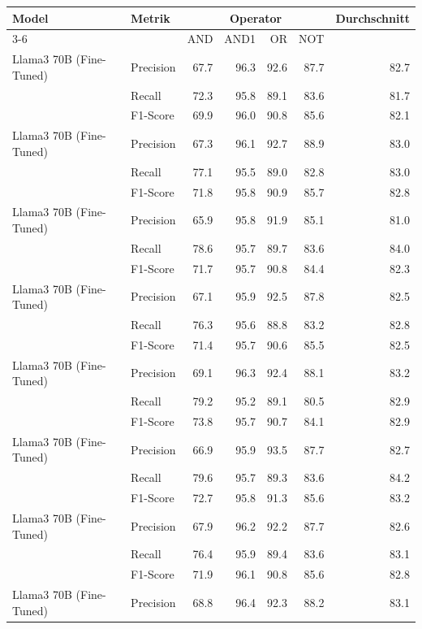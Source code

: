 \begin{table}[!ht]
\centering
\small
\begin{tabular}{llrrrrr}
\toprule
\textbf{Model} & \textbf{Metrik} & \multicolumn{4}{c}{\textbf{Operator}} & \textbf{Durchschnitt} \\
\cmidrule(lr){3-6}
& & AND & AND1 & OR & NOT & \\
\midrule
Llama3 70B
(Fine-Tuned) & Precision & 67.7 & 96.3 & 92.6 & 87.7 & 82.7 \\
 & Recall & 72.3 & 95.8 & 89.1 & 83.6 & 81.7 \\
 & F1-Score & 69.9 & 96.0 & 90.8 & 85.6 & 82.1 \\
\midrule
Llama3 70B
(Fine-Tuned) & Precision & 67.3 & 96.1 & 92.7 & 88.9 & 83.0 \\
 & Recall & 77.1 & 95.5 & 89.0 & 82.8 & 83.0 \\
 & F1-Score & 71.8 & 95.8 & 90.9 & 85.7 & 82.8 \\
\midrule
Llama3 70B
(Fine-Tuned) & Precision & 65.9 & 95.8 & 91.9 & 85.1 & 81.0 \\
 & Recall & 78.6 & 95.7 & 89.7 & 83.6 & 84.0 \\
 & F1-Score & 71.7 & 95.7 & 90.8 & 84.4 & 82.3 \\
\midrule
Llama3 70B
(Fine-Tuned) & Precision & 67.1 & 95.9 & 92.5 & 87.8 & 82.5 \\
 & Recall & 76.3 & 95.6 & 88.8 & 83.2 & 82.8 \\
 & F1-Score & 71.4 & 95.7 & 90.6 & 85.5 & 82.5 \\
\midrule
Llama3 70B
(Fine-Tuned) & Precision & 69.1 & 96.3 & 92.4 & 88.1 & 83.2 \\
 & Recall & 79.2 & 95.2 & 89.1 & 80.5 & 82.9 \\
 & F1-Score & 73.8 & 95.7 & 90.7 & 84.1 & 82.9 \\
\midrule
Llama3 70B
(Fine-Tuned) & Precision & 66.9 & 95.9 & 93.5 & 87.7 & 82.7 \\
 & Recall & 79.6 & 95.7 & 89.3 & 83.6 & 84.2 \\
 & F1-Score & 72.7 & 95.8 & 91.3 & 85.6 & 83.2 \\
\midrule
Llama3 70B
(Fine-Tuned) & Precision & 67.9 & 96.2 & 92.2 & 87.7 & 82.6 \\
 & Recall & 76.4 & 95.9 & 89.4 & 83.6 & 83.1 \\
 & F1-Score & 71.9 & 96.1 & 90.8 & 85.6 & 82.8 \\
\midrule
Llama3 70B
(Fine-Tuned) & Precision & 68.8 & 96.4 & 92.3 & 88.2 & 83.1 \\

\end{tabular}
\end{table}
